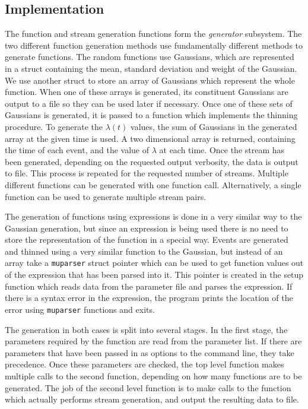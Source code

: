 \documentclass[a4paper,11pt]{article}
\begin{document}
\subsection{Implementation}
\label{sec-5-3}

   The function and stream generation functions form the \emph{generator}
   subsystem. The two different function generation methods use fundamentally
   different methods to generate functions. The random functions use Gaussians,
   which are represented in a struct containing the mean, standard deviation and
   weight of the Gaussian. We use another struct to store an array of Gaussians
   which represent the whole function. When one of these arrays is generated,
   its constituent Gaussians are output to a file so they can be used later if
   necessary. Once one of these sets of Gaussians is generated, it is passed to
   a function which implements the thinning procedure. To generate the $\lambda(t)$
   values, the sum of Gaussians in the generated array at the given time is
   used. A two dimensional array is returned, containing the time of each event,
   and the value of $\lambda$ at each time. Once the stream has been generated,
   depending on the requested output verbosity, the data is output to file. This
   process is repeated for the requested number of streams. Multiple different
   functions can be generated with one function call. Alternatively, a single
   function can be used to generate multiple stream pairs.

   The generation of functions using expressions is done in a very similar way
   to the Gaussian generation, but since an expression is being used there is no
   need to store the representation of the function in a special way. Events are
   generated and thinned using a very similar function to the Gaussian, but
   instead of an array take a \texttt{muparser} struct pointer which can be used
   to get function values out of the expression that has been parsed into
   it. This pointer is created in the setup function which reads data from the
   parameter file and parses the expression. If there is a syntax error in the
   expression, the program prints the location of the error using
   \texttt{muparser} functions and exits.

   The generation in both cases is split into several stages. In the first
   stage, the parameters required by the function are read from the parameter
   list. If there are parameters that have been passed in as options to the
   command line, they take precedence. Once these parameters are checked, the
   top level function makes multiple calls to the second function, depending on
   how many functions are to be generated. The job of the second level function
   is to make calls to the function which actually performs stream generation,
   and output the resulting data to file.
\end{document}
